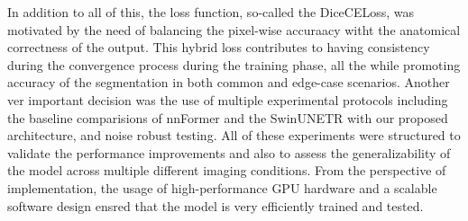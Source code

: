 In addition to all of this, the loss function, so-called the DiceCELoss, was motivated by the need of balancing the pixel-wise accuraacy witht the anatomical correctness of the output. This hybrid loss contributes to having consistency during the convergence process during the training phase, all the while promoting accuracy of the segmentation in both common and edge-case scenarios. Another ver important decision was the use of multiple experimental protocols including the baseline comparisions of nnFormer and the SwinUNETR with our proposed architecture, and noise robust testing. All of these experiments were structured to validate the performance improvements and also to assess the generalizability of the model across multiple different imaging conditions. From the perspective of implementation, the usage of high-performance GPU hardware and a scalable software design ensred that the model is very efficiently trained and tested.

